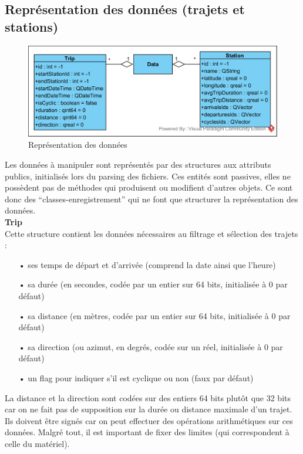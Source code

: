 \documentclass[12pt]{article}
\begin{document}
		\subsection{Représentation des données (trajets et stations)}
		\begin{figure}[!h]
		\begin{center}
		\includegraphics[scale=1]{dia_class_data.png}
		\caption{Représentation des données}
		\end{center}
		\end{figure}		
			
		Les données à manipuler sont représentés par des structures aux attributs publics,
		initialisés lors du parsing des fichiers. Ces entités sont passives, elles ne possèdent
		pas de méthodes qui produisent ou modifient d’autres objets. Ce sont
		donc des “classes-enregistrement” qui ne font que structurer la représentation des
		données.\\		
			
		\textbf{Trip}\\
		Cette structure contient les données nécessaires au filtrage et sélection des
		trajets :\\		
		\begin{itemize}
			\item[•]ses temps de départ et d’arrivée (comprend la date ainsi que l’heure)
			\item[•]sa durée (en secondes, codée par un entier sur 64 bits, initialisée à
			0 par défaut)
			\item[•]sa distance (en mètres, codée par un entier sur 64 bits, initialisée
			à 0 par défaut)
			\item[•]sa direction (ou azimut, en degrés, codée sur un réel, initialisée à
			0 par défaut)
			\item[•]un flag pour indiquer s’il est cyclique ou non (faux par défaut)\\
		\end{itemize}
			
		La distance et la direction sont codées sur des entiers 64 bits plutôt que 32 bits car on ne fait pas de supposition sur la durée ou distance maximale d’un trajet. Ils doivent être signés car on peut effectuer des opérations arithmétiques sur ces données. Malgré tout, il est important de fixer des limites (qui correspondent à celle du matériel).\\
			
\end{document}
